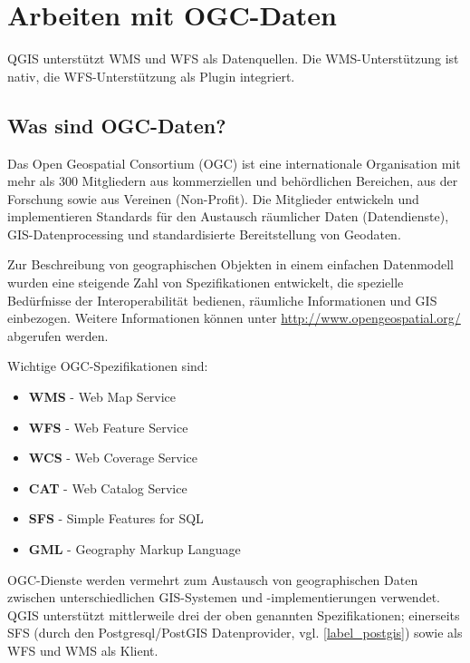 
\chapter{Arbeiten mit OGC-Daten}\label{work_ogc}


QGIS unterstützt WMS und WFS als Datenquellen. Die WMS-Unterstützung ist nativ,
die WFS-Unterstützung als Plugin integriert.

\section{Was sind OGC-Daten?}

Das Open Geospatial Consortium (OGC)  ist eine internationale Organisation
mit mehr als 300 Mitgliedern aus kommerziellen und behördlichen Bereichen,
aus der Forschung sowie aus Vereinen (Non-Profit). Die Mitglieder entwickeln
und implementieren Standards für den Austausch räumlicher Daten
(Datendienste), GIS-Datenprocessing und standardisierte Bereitstellung von Geodaten.

Zur Beschreibung von geographischen Objekten in einem einfachen Datenmodell
wurden eine steigende Zahl von Spezifikationen entwickelt, die spezielle
Bedürfnisse der Interoperabilität bedienen, räumliche Informationen und GIS
einbezogen. Weitere Informationen können unter
\url{http://www.opengeospatial.org/} abgerufen werden.

Wichtige OGC-Spezifikationen sind:

\begin{itemize}
\item \textbf{WMS} - Web Map Service
\item \textbf{WFS} - Web Feature Service
\item \textbf{WCS} - Web Coverage Service
\item \textbf{CAT} - Web Catalog Service
\item \textbf{SFS} - Simple Features for SQL
\item \textbf{GML} - Geography Markup Language
\end{itemize}

OGC-Dienste werden vermehrt zum Austausch von geographischen Daten zwischen
unterschiedlichen GIS-Systemen und -implementierungen verwendet.
QGIS unterstützt mittlerweile drei der oben genannten Spezifikationen;
einerseits SFS (durch den Postgresql/PostGIS Datenprovider, vgl.
\ref{label_postgis}) sowie als WFS und WMS als Klient.

